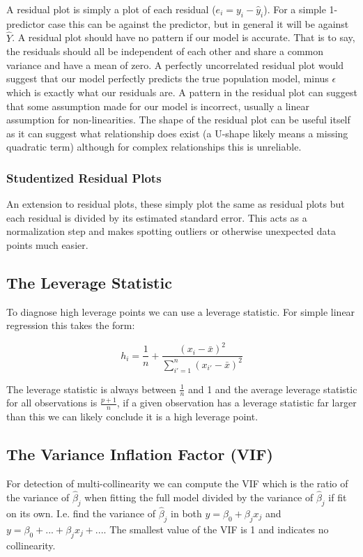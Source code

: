 A residual plot is simply a plot of each residual ($e_{i} = y_{i} - \hat{y}_{i}$). For a simple 1-predictor case this can be against the predictor, but in general it will be against $\hat{Y}$. A residual plot should have no pattern if our model is accurate. That is to say, the residuals should all be independent of each other and share a common variance and have a mean of zero. A perfectly uncorrelated residual plot would suggest that our model perfectly predicts the true population model, minus $\epsilon$ which is exactly what our residuals are. A pattern in the residual plot can suggest that some assumption made for our model is incorrect, usually a linear assumption for non-linearities. The shape of the residual plot can be useful itself as it can suggest what relationship does exist (a U-shape likely means a missing quadratic term) although for complex relationships this is unreliable.

\subsubsection{Studentized Residual Plots}

An extension to residual plots, these simply plot the same as residual plots but each residual is divided by its estimated standard error. This acts as a normalization step and makes spotting outliers or otherwise unexpected data points much easier.

\subsection{The Leverage Statistic}

To diagnose high leverage points we can use a leverage statistic. For simple linear regression this takes the form:

$$ h_{i} = \frac{1}{n} + \frac{(x_{i}-\bar{x})^{2}}{\sum^{n}_{i'=1} (x_{i'}-\bar{x})^{2}} $$

The leverage statistic is always between $\frac{1}{n}$ and 1 and the average leverage statistic for all observations is $\frac{p+1}{n}$, if a given observation has a leverage statistic far larger than this we can likely conclude it is a high leverage point.

\subsection{The Variance Inflation Factor (VIF)}

For detection of multi-collinearity we can compute the VIF which is the ratio of the variance of $\hat{\beta}_{j}$ when fitting the full model divided by the variance of $\hat{\beta}_{j}$ if fit on its own. I.e. find the variance of $\hat{\beta}_{j}$ in both $y = \beta_{0} + \beta_{j}x_{j}$ and $y = \beta_{0} + ... + \beta_{j}x_{j} + ...$. The smallest value of the VIF is 1 and indicates no collinearity.

